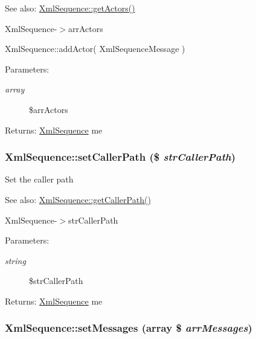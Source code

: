 \begin{Desc}
\item[See also:]\hyperlink{class_xml_sequence_dcce8335021177bac08889348f2a508e}{XmlSequence::getActors()} 

XmlSequence-$>$arrActors 

XmlSequence::addActor( XmlSequenceMessage ) \end{Desc}
\begin{Desc}
\item[Parameters:]
\begin{description}
\item[{\em array}]\$arrActors \end{description}
\end{Desc}
\begin{Desc}
\item[Returns:]\hyperlink{class_xml_sequence}{XmlSequence} me \end{Desc}
\hypertarget{class_xml_sequence_2b5e654d8a5559dc263da2d3bdbd043e}{
\subsubsection[{setCallerPath}]{\setlength{\rightskip}{0pt plus 5cm}XmlSequence::setCallerPath (\$ {\em strCallerPath})}}
\label{class_xml_sequence_2b5e654d8a5559dc263da2d3bdbd043e}


Set the caller path

\begin{Desc}
\item[See also:]\hyperlink{class_xml_sequence_197ff62ed0c4d22324218206147f25e4}{XmlSequence::getCallerPath()} 

XmlSequence-$>$strCallerPath \end{Desc}
\begin{Desc}
\item[Parameters:]
\begin{description}
\item[{\em string}]\$strCallerPath \end{description}
\end{Desc}
\begin{Desc}
\item[Returns:]\hyperlink{class_xml_sequence}{XmlSequence} me \end{Desc}
\hypertarget{class_xml_sequence_3cf549fbc588fc2bc0bbd74f818dfe91}{
\subsubsection[{setMessages}]{\setlength{\rightskip}{0pt plus 5cm}XmlSequence::setMessages (array \$ {\em arrMessages})}}
\label{class_xml_sequence_3cf549fbc588fc2bc0bbd74f818dfe91}


